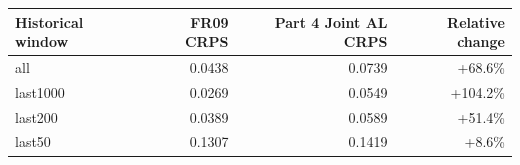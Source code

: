 \begin{tabular}{lrrr}
\toprule
Historical window & FR09 CRPS & Part 4 Joint AL CRPS & Relative change \\
\midrule
all & 0.0438 & 0.0739 & +68.6\% \\
last1000 & 0.0269 & 0.0549 & +104.2\% \\
last200 & 0.0389 & 0.0589 & +51.4\% \\
last50 & 0.1307 & 0.1419 & +8.6\% \\
\bottomrule
\end{tabular}

